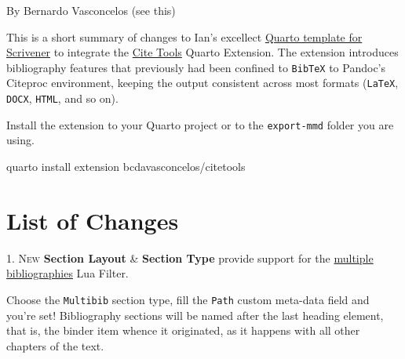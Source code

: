\documentclass[
  12pt,
  a4paper,
  oneside]{scrbook}
\begin{document}
\protect\hypertarget{scriv27}{}{}

By Bernardo Vasconcelos (see this)

This is a short summary of changes to Ian's excellect
\href{http://forum.literatureandlatte.com/t/scrivener-quarto-a-technical-academic-publishing-workflow/129769?u=bernardo_vasconcelos}{Quarto
template for Scrivener} to integrate the
\href{http://bcdavasconcelos.github.io/citetools/}{Cite Tools} Quarto
Extension. The extension introduces bibliography features that
previously had been confined to \texttt{BibTeX} to Pandoc's Citeproc
environment, keeping the output consistent across most formats
(\texttt{LaTeX}, \texttt{DOCX}, \texttt{HTML}, and so on).

Install the extension to your Quarto project or to the
\texttt{export-mmd} folder you are using.

quarto install extension bcdavasconcelos/citetools

\hypertarget{list-of-changes}{%
\section{List of Changes}\label{list-of-changes}}

\protect\hypertarget{scriv28}{}{}

\textsc{1. New} \textbf{Section Layout} \& \textbf{Section Type} provide
support for the
\href{https://github.com/pandoc/lua-filters/tree/master/multiple-bibliographies}{multiple
bibliographies} Lua Filter.

\begin{tcolorbox}[enhanced jigsaw, bottomtitle=1mm, left=2mm, colframe=quarto-callout-tip-color-frame, colback=white, bottomrule=.15mm, title=\textcolor{quarto-callout-tip-color}{\faLightbulb}\hspace{0.5em}{Tip}, toprule=.15mm, toptitle=1mm, titlerule=0mm, opacitybacktitle=0.6, leftrule=.75mm, rightrule=.15mm, breakable, colbacktitle=quarto-callout-tip-color!10!white, arc=.35mm, opacityback=0, coltitle=black]

Choose the \texttt{Multibib} section type, fill the \texttt{Path} custom
meta-data field and you're set! Bibliography sections will be named
after the last heading element, that is, the binder item whence it
originated, as it happens with all other chapters of the text.

\end{tcolorbox}
\end{document}
